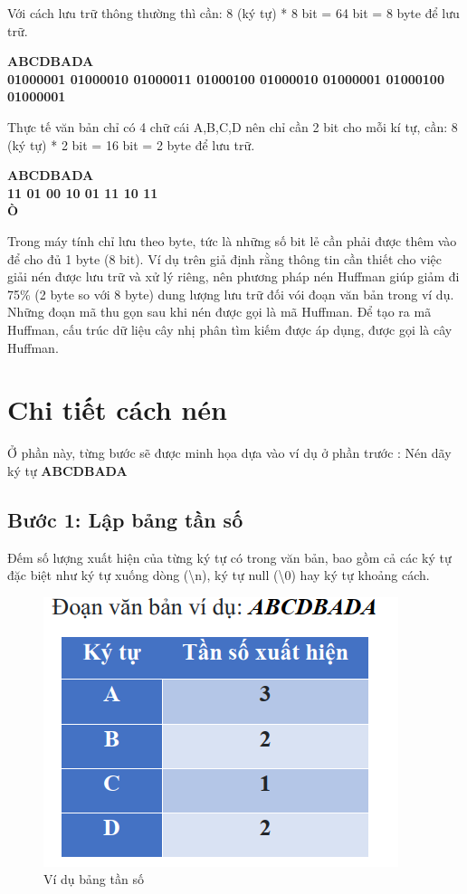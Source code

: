 \documentclass[14pt]{extreport}
\begin{document}
Với cách lưu trữ thông thường thì cần: 8 (ký tự) * 8 bit = 64 bit = 8 byte để lưu trữ.

\textbf{ABCDBADA\\
01000001 01000010 01000011 01000100 01000010 01000001 01000100 01000001
}


Thực tế văn bản chỉ có 4 chữ cái A,B,C,D nên chỉ cần 2 bit cho mỗi kí tự, cần: 8 (ký tự) * 2 bit = 16 bit = 2 byte để lưu trữ.

\textbf{ABCDBADA\\
11 01 00 10 01 11 10 11\\
Ò
}

Trong máy tính chỉ lưu theo byte, tức là những số bit lẻ cần phải được thêm vào để cho đủ 1 byte (8 bit). Ví dụ trên giả định rằng thông tin cần thiết cho việc giải nén được lưu trữ và xử lý riêng, nên phương pháp nén Huffman giúp giảm đi 75\% (2 byte so với 8 byte) dung lượng lưu trữ đối vói đoạn văn bản trong ví dụ. Những đoạn mã thu gọn sau khi nén được gọi là mã Huffman.
Để tạo ra mã Huffman, cấu trúc dữ liệu cây nhị phân tìm kiếm được áp dụng, được gọi là cây Huffman.
\section{Chi tiết cách nén}
Ở phần này, từng bước sẽ được minh họa dựa vào ví dụ ở phần trước : Nén dãy ký tự \textbf{ABCDBADA}
\subsection{Bước 1: Lập bảng tần số}
Đếm số lượng xuất hiện của từng ký tự có trong văn bản, bao gồm cả các ký tự đặc biệt như ký tự xuống dòng (\textbackslash n), ký tự null (\textbackslash 0) hay ký tự khoảng cách.

\begin{center}
    \begin{figure}[H]
    \begin{center}
     \includegraphics[scale=.65]{sequence_table.PNG}
    \end{center}
    \caption{Ví dụ bảng tần số}
    \label{refhinh1}
    \end{figure}
\end{center}
\end{document}
